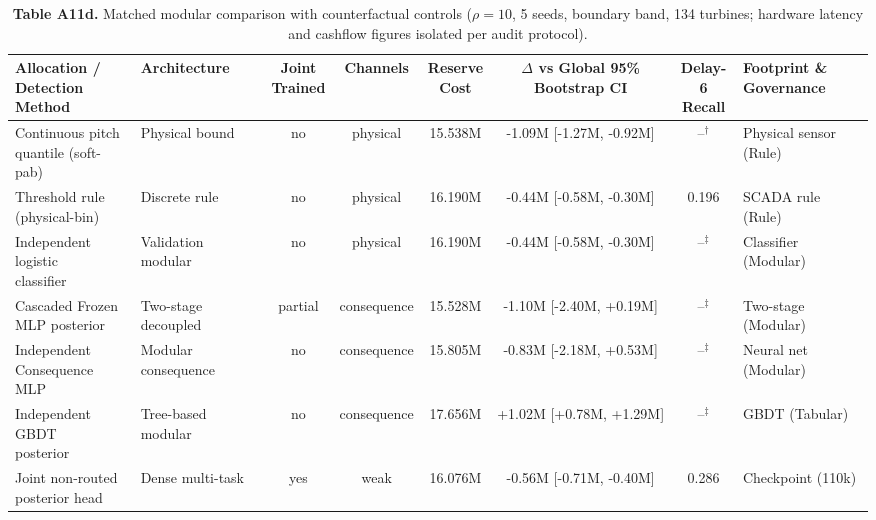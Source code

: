 \documentclass[
  journal]{IEEEtran}
\begin{document}
\begin{table}[!t]
\centering
\fontsize{8.0pt}{9.2pt}\selectfont
\setlength{\tabcolsep}{2.0pt}
\renewcommand{\arraystretch}{1.03}
\caption*{\textbf{Table A11d.} Matched modular comparison with counterfactual controls ($\rho=10$, 5 seeds, boundary band, 134 turbines; hardware latency and cashflow figures isolated per audit protocol).}
%
\begin{tabular*}{\textwidth}{@{\extracolsep{\fill}}llcccccl@{}}
\toprule
\shortstack[l]{Allocation /\\Detection Method} & Architecture & \shortstack{Joint\\Trained} & Channels & \shortstack{Reserve\\Cost} & \shortstack{$\Delta$ vs Global\\95\% Bootstrap CI} & \shortstack{Delay-6\\Recall} & \shortstack[l]{Footprint \&\\Governance} \\
\midrule
\shortstack[l]{Continuous pitch\\quantile (soft-pab)} & Physical bound & no & physical & 15.538M & -1.09M [-1.27M, -0.92M] & --$^{\dagger}$ & Physical sensor (Rule) \\
\shortstack[l]{Threshold rule\\(physical-bin)} & Discrete rule & no & physical & 16.190M & -0.44M [-0.58M, -0.30M] & 0.196 & SCADA rule (Rule) \\
\shortstack[l]{Independent logistic\\classifier} & Validation modular & no & physical & 16.190M & -0.44M [-0.58M, -0.30M] & --$^{\ddagger}$ & Classifier (Modular) \\
\shortstack[l]{Cascaded Frozen\\MLP posterior} & Two-stage decoupled & partial & consequence & 15.528M & -1.10M [-2.40M, +0.19M] & --$^{\ddagger}$ & Two-stage (Modular) \\
\shortstack[l]{Independent\\Consequence MLP} & Modular consequence & no & consequence & 15.805M & -0.83M [-2.18M, +0.53M] & --$^{\ddagger}$ & Neural net (Modular) \\
\shortstack[l]{Independent GBDT\\posterior} & Tree-based modular & no & consequence & 17.656M & +1.02M [+0.78M, +1.29M] & --$^{\ddagger}$ & GBDT (Tabular) \\
\shortstack[l]{Joint non-routed\\posterior head} & Dense multi-task & yes & weak & 16.076M & -0.56M [-0.71M, -0.40M] & 0.286 & Checkpoint (110k) \\

\end{tabular*}
\end{table}
\end{document}
